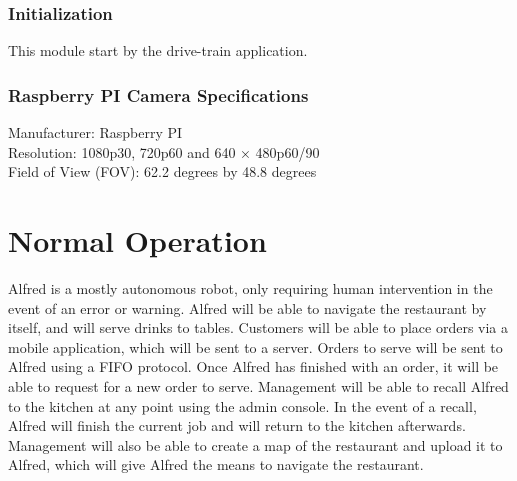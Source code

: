 \documentclass [10pt]{article}
\begin{document}

\subsubsection{Initialization}
This module start by the drive-train application.


\subsubsection{Raspberry PI Camera Specifications}
Manufacturer: Raspberry PI \\
Resolution: 1080p30, 720p60 and 640 × 480p60/90\\
Field of View (FOV): 62.2 degrees by 48.8 degrees\\


\section{Normal Operation}
Alfred is a mostly autonomous robot, only requiring human intervention in the event of an error or warning. Alfred will be able to navigate the restaurant by itself, and will serve drinks to tables. Customers will be able to place orders via a mobile application, which will be sent to a server. Orders to serve will be sent to Alfred using a FIFO protocol. Once Alfred has finished with an order, it will be able to request for a new order to serve. Management will be able to recall Alfred to the kitchen at any point using the admin console. In the event of a recall, Alfred will finish the current job and will return to the kitchen afterwards. Management will also be able to create a map of the restaurant and upload it to Alfred, which will give Alfred the means to navigate the restaurant.


\end{document}

